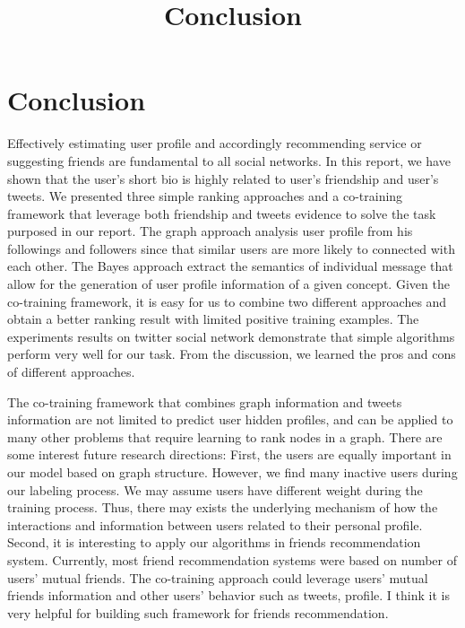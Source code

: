\documentclass{article}
\begin{document}
\title{Conclusion}
\maketitle \else \fi

\section{Conclusion}\label{sec:conclusion}
Effectively estimating user profile and accordingly recommending service or suggesting friends are fundamental to all social networks. In this report, we have shown that the user's short bio is highly related to user's friendship and user's tweets. We presented three simple ranking approaches and a co-training framework that leverage both friendship and tweets evidence to solve the task purposed in our report. The graph approach analysis user profile from his followings and followers since that similar users are more likely to connected with each other. The Bayes approach extract the semantics of individual message that allow for the generation of user profile information of a given concept. Given the co-training framework, it is easy for us to combine two different approaches and obtain a better ranking result with limited positive training examples. The experiments results on twitter social network demonstrate that simple algorithms perform very well for our task. From the discussion, we learned the pros and cons of different approaches.

The co-training framework that combines graph information and tweets information are not limited to predict user hidden profiles, and can be applied to many other problems that require learning to rank nodes in a graph. There are some interest future research directions: First, the users are equally important in our model based on graph structure. However, we find many inactive users during our labeling process. We may assume users have different weight during the training process. Thus, there may exists the underlying mechanism of how the interactions and information between users related to their personal profile. Second, it is interesting to apply our algorithms in friends recommendation system. Currently, most friend recommendation systems were based on number of users' mutual friends. The co-training approach could leverage users' mutual friends information and other users' behavior such as tweets, profile. I think it is very helpful for building such framework for friends recommendation.

\ifx \allfiles \undefined
\end{document}
